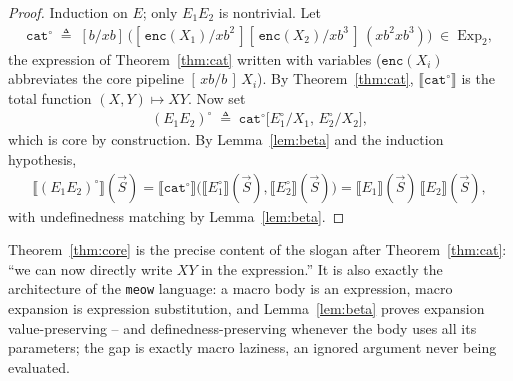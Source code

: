 \documentclass[runningheads,envcountsect]{llncs}
\renewenvironment{remark}
  {\rmfamily\trivlist\item[\hskip\labelsep{\itshape Remark.}]\ignorespaces}
  {\endtrivlist}
\begin{document}
\begin{proof}
    Induction on $E$; only $E_1E_2$ is nontrivial. Let
    \begin{align}
        \mathtt{cat}^\circ \;\triangleq\; [b/xb]\,\Big([\,\mathtt{enc}(X_1)/xb^2\,][\,\mathtt{enc}(X_2)/xb^3\,]\,(xb^2xb^3)\Big) \;\in\; \mathrm{Exp}_2,
    \end{align}
    the expression of Theorem~\ref{thm:cat} written with variables ($\mathtt{enc}(X_i)$ abbreviates the core pipeline $[\,xb/b\,]\,X_i$). By Theorem~\ref{thm:cat}, $\llbracket \mathtt{cat}^\circ \rrbracket$ is the total function $(X, Y) \mapsto XY$. Now set
    \begin{align}
        (E_1E_2)^\circ \;\triangleq\; \mathtt{cat}^\circ\big[E_1^\circ/X_1,\, E_2^\circ/X_2\big],
    \end{align}
    which is core by construction. By Lemma~\ref{lem:beta} and the induction hypothesis,
    \begin{align}
        \llbracket (E_1E_2)^\circ \rrbracket(\vec S) = \llbracket \mathtt{cat}^\circ \rrbracket\big(\llbracket E_1^\circ \rrbracket(\vec S), \llbracket E_2^\circ \rrbracket(\vec S)\big) = \llbracket E_1 \rrbracket(\vec S)\,\llbracket E_2 \rrbracket(\vec S),
    \end{align}
    with undefinedness matching by Lemma~\ref{lem:beta}.
\end{proof}

\begin{remark}
    Theorem~\ref{thm:core} is the precise content of the slogan after Theorem~\ref{thm:cat}: ``we can now directly write $XY$ in the expression.'' It is also exactly the architecture of the \texttt{meow} language: a macro body is an expression, macro expansion is expression substitution, and Lemma~\ref{lem:beta} proves expansion value-preserving -- and definedness-preserving whenever the body uses all its parameters; the gap is exactly macro laziness, an ignored argument never being evaluated.
\end{remark}
\end{document}
